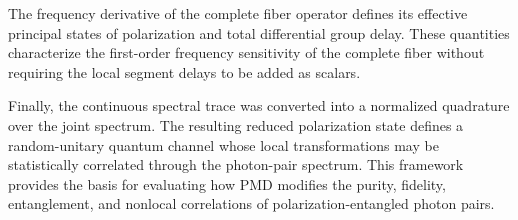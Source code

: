 The frequency derivative of the complete fiber operator defines its
effective principal states of polarization and total differential group
delay. These quantities characterize the first-order frequency sensitivity
of the complete fiber without requiring the local segment delays to be added
as scalars.

Finally, the continuous spectral trace was converted into a normalized
quadrature over the joint spectrum. The resulting reduced polarization state
defines a random-unitary quantum channel whose local transformations may be
statistically correlated through the photon-pair spectrum. This framework
provides the basis for evaluating how PMD modifies the purity, fidelity,
entanglement, and nonlocal correlations of polarization-entangled photon
pairs.